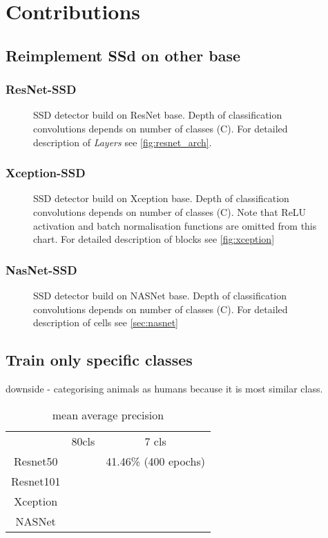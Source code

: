 \chapter{Contributions}
 \cite{bib:benchmark}

\section{Reimplement SSd on other base}
\subsection{ResNet-SSD}
\begin{figure}
    \label{fig:resnetSSD}
    \resnetSSD
    \caption{SSD detector build on ResNet base. Depth of classification convolutions depends on number of classes (C). For detailed description of \textit{Layers} see \cref{fig:resnet_arch}.}
\end{figure}

\subsection{Xception-SSD}


\begin{figure}
    \label{fig:xceptionSSD}
    \xceptionSSD
    \caption{SSD detector build on Xception base. Depth of classification convolutions depends on number of classes (C). Note that ReLU activation and batch normalisation functions are omitted from this chart. For detailed description of blocks see \cref{fig:xception}}
\end{figure}

\subsection{NasNet-SSD}

\begin{figure}
    \label{fig:nasnetSSD}
    \nasnetSSD
    \caption{SSD detector build on NASNet base. Depth of classification convolutions depends on number of classes (C). For detailed description of cells see \cref{sec:nasnet}}
\end{figure}


\section{Train only specific classes}
downside - categorising animals as humans because it is most similar class.
\begin{table}
    \begin{tabular}{c|c|c}
         & 80cls & 7 cls \\
        Resnet50 & & 41.46\% (400 epochs)\\
        Resnet101 & & \\
        Xception & & \\
        NASNet & & \\
    \end{tabular}
    \caption{mean average precision}
    \label{tab:map}
\end{table}


